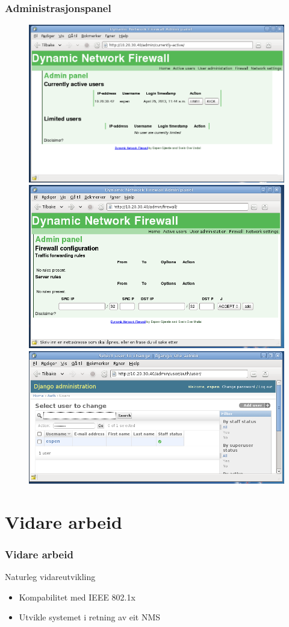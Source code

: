 \documentclass[nynorsk,14pt]{beamer}
\begin{document}
\begin{frame} %
	\frametitle{Administrasjonspanel}
	\begin{figure}
		\includegraphics[scale=0.18]{imgs/admin_users.png}
		\includegraphics[scale=0.19]{imgs/custom_firewall.png} \\
		\includegraphics[scale=0.18]{imgs/django_user.png}
	\end{figure}
\end{frame}
\section{Vidare arbeid}
\begin{frame} %
	\frametitle{Vidare arbeid}
	Naturleg vidareutvikling
	\begin{itemize}
		\item Kompabilitet med IEEE 802.1x
		\item Utvikle systemet i retning av eit NMS
	\end{itemize}
\end{frame}
\end{document}
